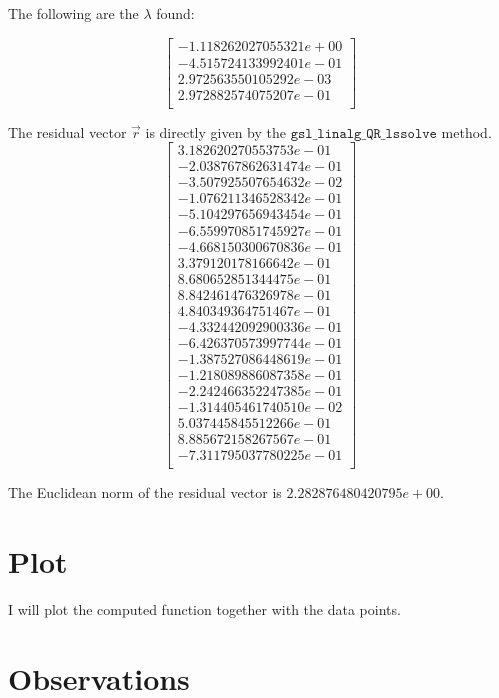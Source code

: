 \documentclass{article}
\newcommand{\code}{\texttt}
\begin{document}
The following are the $\lambda$ found:

$$
\begin{bmatrix}
-1.118262027055321e+00\\
-4.515724133992401e-01\\
2.972563550105292e-03\\
2.972882574075207e-01\\
\end{bmatrix}
$$

The residual vector $\vec{r}$ is directly given by the $\code{gsl\_linalg\_QR\_lssolve}$ method.
$$
\begin{bmatrix}
3.182620270553753e-01\\
-2.038767862631474e-01\\
-3.507925507654632e-02\\
-1.076211346528342e-01\\
-5.104297656943454e-01\\
-6.559970851745927e-01\\
-4.668150300670836e-01\\
3.379120178166642e-01\\
8.680652851344475e-01\\
8.842461476326978e-01\\
4.840349364751467e-01\\
-4.332442092900336e-01\\
-6.426370573997744e-01\\
-1.387527086448619e-01\\
-1.218089886087358e-01\\
-2.242466352247385e-01\\
-1.314405461740510e-02\\
5.037445845512266e-01\\
8.885672158267567e-01\\
-7.311795037780225e-01\\
\end{bmatrix} 
$$

The Euclidean norm of the residual vector is $2.282876480420795e+00$.

\section{Plot}
I will plot the computed function together with the data points.
\section{Observations}
\end{document}
